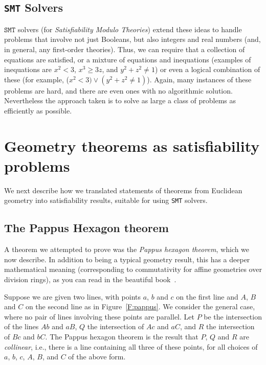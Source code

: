 \documentclass{amsart}
\theoremstyle{plain}
\theoremstyle{definition}
\theoremstyle{remark}
\begin{document}
\subsection{\texttt{SMT} Solvers}
\(\texttt{SMT}\) solvers (for \emph{Satisfiability Modulo Theories}) extend these
ideas to handle problems that involve not just Booleans, but also
integers and real numbers (and, in general, any first-order theories). Thus, we can require that a collection of
equations are satisfied, or a mixture of equations and inequations
(examples of inequations are \(x^2 < 3\), \(x^3 \geq 3z\), and
\(y^2 + z^2 \neq 1\)) or even a logical combination of these (for example,
(\(x^2 < 3)\vee(y^2 + z^2 \neq 1)\)). Again, many instances of these problems are hard, and there
are even ones with no algorithmic solution. Nevertheless the approach
taken is to solve as large a class of problems as efficiently as
possible.


\section{Geometry theorems as satisfiability problems}

We next describe how we translated statements of theorems from
Euclidean geometry into satisfiability results, suitable for using \texttt{SMT} solvers.

\subsection{The Pappus Hexagon theorem}
A theorem we attempted to prove was the \emph{Pappus hexagon theorem}, which
we now describe. In addition to being a typical geometry result, this
has a deeper mathematical meaning (corresponding to commutativity for
affine geometries over division rings), as you can read in the beautiful book~\cite{Ar}.

Suppose we are given two lines, with points \(a\), \(b\) and \(c\) on
the first line and \(A\), \(B\) and \(C\) on the second line as in
Figure~\ref{F:pappus}. We consider the general case, where no pair of lines
involving these points are parallel. Let \(P\) be the intersection of
the lines \(Ab\) and \(aB\), \(Q\) the intersection of \(Ac\) and
\(aC\), and \(R\) the intersection of \(Bc\) and \(bC\). The Pappus
hexagon theorem is the result that \(P\), \(Q\) and \(R\) are
\emph{collinear}, i.e., there is a line containing all three of these
points, for all choices of \(a\), \(b\), \(c\), \(A\), \(B\), and \(C\)
of the above form.
\end{document}
